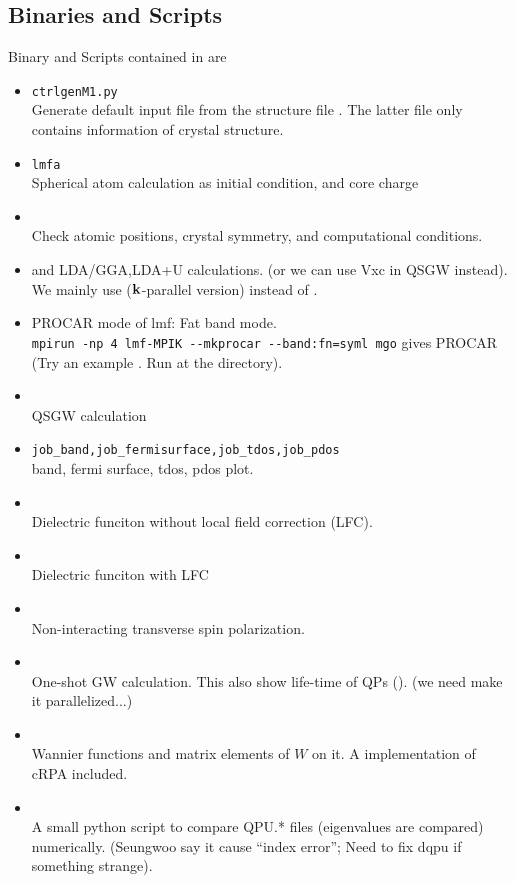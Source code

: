 \subsection{Binaries and Scripts}
Binary and Scripts contained in \ecalj are
\begin{itemize}
\item {\tt ctrlgenM1.py}\\
  Generate default input file \ctrl from the structure file
  \ctrls. The latter file only contains information of crystal structure.
\item {\tt lmfa}\\
  Spherical atom calculation as initial condition, and core charge 
\item \lmchk\\
  Check atomic positions, crystal symmetry, and computational conditions.
\item {} and 
  LDA/GGA,LDA+U calculations. (or we can use Vxc in QSGW instead).
  We mainly use  (${\bf k}$-parallel version) instead of .
\item 
  PROCAR mode of lmf: Fat band mode.\\
  \verb#mpirun -np 4 lmf-MPIK --mkprocar --band:fn=syml mgo# gives PROCAR \\
   (Try an example . 
    Run  at the directory).
\item {}\\
     QSGW calculation
\item \verb#job_band,job_fermisurface,job_tdos,job_pdos#\\
     band, fermi surface, tdos, pdos plot.
\item {}\\
     Dielectric funciton without local field correction (LFC).
\item {}\\
     Dielectric funciton with LFC
\item {}\\
      Non-interacting transverse spin polarization.
\item {}\\ One-shot GW calculation. 
       This also show life-time of QPs ().
      (we need make it parallelized...)
\item {}\\ Wannier functions and matrix elements of $W$ on
      it. A implementation of cRPA included.
\item {}\\
      A small python script to compare QPU.* files (eigenvalues are
      compared) numerically. 
      (Seungwoo say it cause ``index error''; Need to fix dqpu if
      something strange).
\end{itemize}


